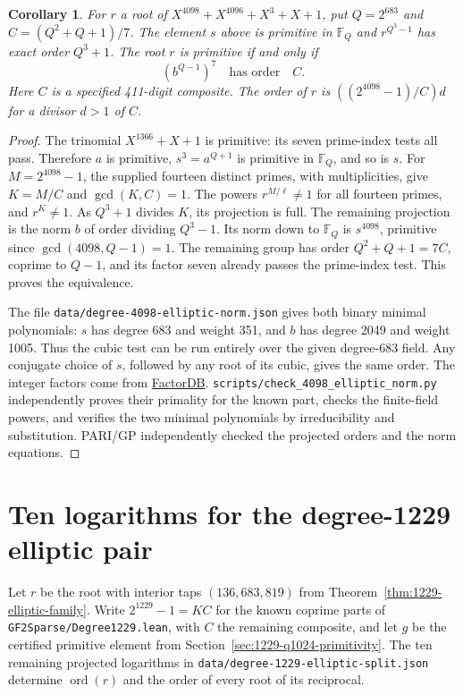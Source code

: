 \documentclass[11pt]{article}
\newtheorem{corollary}[theorem]{Corollary}
\newcommand{\ord}{\operatorname{ord}}
\begin{document}
\begin{corollary}\label{cor:4098-cubic}
For \(r\) a root of \(X^{4098}+X^{4096}+X^3+X+1\), put
\(Q=2^{683}\) and \(C=(Q^2+Q+1)/7\). The element \(s\) above is
primitive in \(\mathbb F_Q\) and \(r^{Q^3-1}\) has exact order
\(Q^3+1\). The root \(r\) is primitive if and only if
\[
              (b^{Q-1})^7\quad\text{has order}\quad C .
\]
Here \(C\) is a specified 411-digit composite. The order of \(r\)
is \(((2^{4098}-1)/C)d\) for a divisor \(d>1\) of \(C\).
\end{corollary}
\begin{proof}
The trinomial \(X^{1366}+X+1\) is primitive: its seven prime-index
tests all pass. Therefore \(a\) is primitive, \(s^3=a^{Q+1}\) is
primitive in \(\mathbb F_Q\), and so is \(s\).
For \(M=2^{4098}-1\), the supplied fourteen distinct primes, with
multiplicities, give \(K=M/C\) and \(\gcd(K,C)=1\). The powers
\(r^{M/\ell}\ne1\) for all fourteen primes, and \(r^K\ne1\).
As \(Q^3+1\) divides \(K\), its projection is full.
The remaining projection is the norm \(b\) of order dividing
\(Q^3-1\). Its norm down to \(\mathbb F_Q\) is \(s^{4098}\), primitive
since \(\gcd(4098,Q-1)=1\). The remaining group has order
\(Q^2+Q+1=7C\), coprime to \(Q-1\), and its factor seven already
passes the prime-index test. This proves the equivalence.

The file \nolinkurl{data/degree-4098-elliptic-norm.json} gives both
binary minimal polynomials: \(s\) has degree 683 and weight 351,
and \(b\) has degree 2049 and weight 1005. Thus the cubic test can
be run entirely over the given degree-683 field. Any conjugate
choice of \(s\), followed by any root of its cubic, gives the same
order. The integer factors come from
\href{https://factordb.com/index.php?id=1000000000000004098}{FactorDB}.
\nolinkurl{scripts/check_4098_elliptic_norm.py} independently proves
their primality for the known part, checks the finite-field powers,
and verifies the two minimal polynomials by irreducibility and
substitution. PARI/GP independently checked the projected orders and
the norm equations.
\end{proof}

\section{Ten logarithms for the degree-1229 elliptic pair}
\label{sec:elliptic-ten-logs}
Let \(r\) be the root with interior taps \((136,683,819)\) from
Theorem~\ref{thm:1229-elliptic-family}. Write \(2^{1229}-1=KC\)
for the known coprime parts of \nolinkurl{GF2Sparse/Degree1229.lean},
with \(C\) the remaining composite, and let \(g\) be the certified
primitive element from Section~\ref{sec:1229-q1024-primitivity}.
The ten remaining projected logarithms in
\nolinkurl{data/degree-1229-elliptic-split.json} determine
\(\ord(r)\) and the order of every root of its reciprocal.
\end{document}
